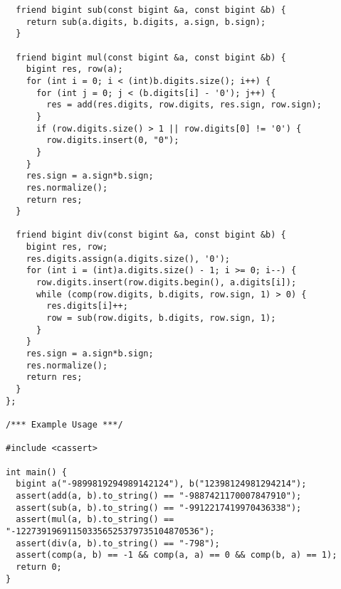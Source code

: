 \begin{lstlisting}
  friend bigint sub(const bigint &a, const bigint &b) {
    return sub(a.digits, b.digits, a.sign, b.sign);
  }

  friend bigint mul(const bigint &a, const bigint &b) {
    bigint res, row(a);
    for (int i = 0; i < (int)b.digits.size(); i++) {
      for (int j = 0; j < (b.digits[i] - '0'); j++) {
        res = add(res.digits, row.digits, res.sign, row.sign);
      }
      if (row.digits.size() > 1 || row.digits[0] != '0') {
        row.digits.insert(0, "0");
      }
    }
    res.sign = a.sign*b.sign;
    res.normalize();
    return res;
  }

  friend bigint div(const bigint &a, const bigint &b) {
    bigint res, row;
    res.digits.assign(a.digits.size(), '0');
    for (int i = (int)a.digits.size() - 1; i >= 0; i--) {
      row.digits.insert(row.digits.begin(), a.digits[i]);
      while (comp(row.digits, b.digits, row.sign, 1) > 0) {
        res.digits[i]++;
        row = sub(row.digits, b.digits, row.sign, 1);
      }
    }
    res.sign = a.sign*b.sign;
    res.normalize();
    return res;
  }
};

/*** Example Usage ***/

#include <cassert>

int main() {
  bigint a("-9899819294989142124"), b("12398124981294214");
  assert(add(a, b).to_string() == "-9887421170007847910");
  assert(sub(a, b).to_string() == "-9912217419970436338");
  assert(mul(a, b).to_string() == "-122739196911503356525379735104870536");
  assert(div(a, b).to_string() == "-798");
  assert(comp(a, b) == -1 && comp(a, a) == 0 && comp(b, a) == 1);
  return 0;
}
\end{lstlisting}
